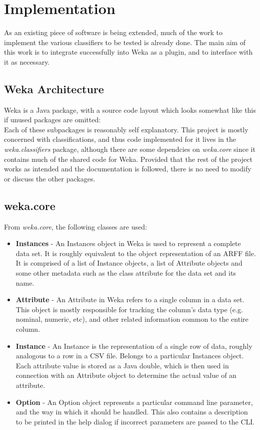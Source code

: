 \section{Implementation}
As an existing piece of software is being extended, much of the work to implement the various classifiers to be tested is already done. The main aim of this work is to integrate successfully into Weka as a plugin, and to interface with it as necessary.
\subsection{Weka Architecture}
Weka is a Java package, with a source code layout which looks somewhat like this if unused packages are omitted: \\
\hfill \break
Each of these subpackages is reasonably self explanatory. This project is mostly concerned with classifications, and thus code implemented for it lives in the \textit{weka.classifiers} package, although there are some dependcies on \textit{weka.core} since it contains much of the shared code for Weka. Provided that the rest of the project works as intended and the documentation is followed, there is no need to modify or discuss the other packages.

\subsection{weka.core}
From \textit{weka.core}, the following classes are used:

\begin{itemize}
\item \textbf{Instances} - An Instances object in Weka is used to represent a complete data set. It is roughly equivalent to the object representation of an ARFF file. It is comprised of a list of Instance objects,  a list of Attribute objects and some other metadata such as the class attribute for the data set and its name.
\item \textbf{Attribute} - An Attribute in Weka refers to a single column in a data set. This object is mostly responsible for tracking the column's data type (e.g. nominal, numeric, etc), and other related information common to the entire column.
\item \textbf{Instance} - An Instance is the representation of a single row of data, roughly analogous to a row in a CSV file. Belongs to a particular Instances object. Each attribute value is stored as a Java double, which is then used in connection with an Attribute object to determine the actual value of an attribute.
\item \textbf{Option} - An Option object represents a particular command line parameter, and the way in which it should be handled. This also contains a description to be printed in the help dialog if incorrect parameters are passed to the CLI.
\end{itemize}

